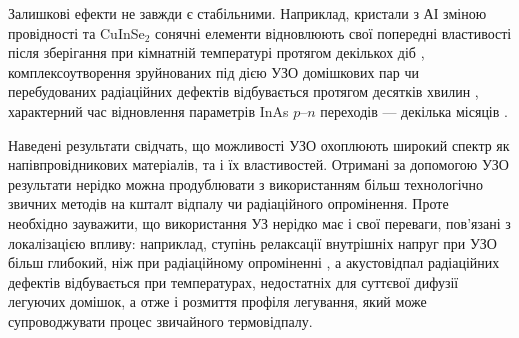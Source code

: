 %
%
%
%
%
%
%
%
%


Залишкові ефекти не завжди є стабільними.
Наприклад, кристали з АІ зміною провідності та  CuInSe$_2$ сонячні елементи відновлюють свої попередні властивості після зберігання при кімнатній температурі протягом декількох діб \cite{YOlikh2006TPLr,US:ZnCdTe,BorkovFTT,OstapSC},
комплексоутворення зруйнованих під дією УЗО домішкових пар чи перебудованих радіаційних дефектів відбувається протягом десятків хвилин \cite{Ostapenko1995SST,Ostapenko1995,YOlikh2006TPLr},
характерний час відновлення параметрів InAs $p$--$n$ переходів --- декілька місяців \cite{Teterkin2009r}.



Наведені результати свідчать, що можливості УЗО охоплюють широкий спектр як напівпровідникових матеріалів, та і їх властивостей.
Отримані за допомогою УЗО результати нерідко можна продублювати з використанням більш технологічно звичних методів на кшталт відпалу чи радіаційного опромінення.
Проте необхідно зауважити, що використання УЗ нерідко має і свої переваги, пов'язані з локалізацією впливу:
наприклад, ступінь релаксації внутрішніх напруг при УЗО більш глибокий, ніж при радіаційному опроміненні \cite{UST:GeGaAs1990},
а акустовідпал радіаційних дефектів \cite{PodolHivr,UST:OstrovCsI,YOlikh2007TPLr} відбувається при температурах, недостатніх для суттєвої дифузії легуючих домішок, а отже і розмиття профіля легування, який може супроводжувати процес звичайного термовідпалу.

